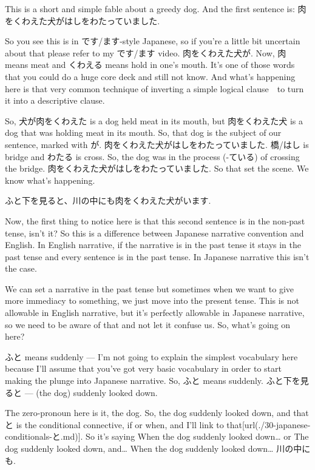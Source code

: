 This is a short and simple fable about a greedy dog. And the first sentence is: 肉をくわえた犬がはしをわたっていました.

{}

So you see this is in です/ます-style Japanese, so if you're a little bit uncertain about that please refer to my です/ます video. 肉をくわえた犬が. Now, 肉 means meat and くわえる means hold in one's mouth. It's one of those words that you could do a huge core deck and still not know. And what's happening here is that very common technique of inverting a simple logical clause　to turn it into a descriptive clause.

{}

So, 犬が肉をくわえた is a dog held meat in its mouth, but 肉をくわえた犬 is a dog that was holding meat in its mouth. So, that dog is the subject of our sentence, marked with が. 肉をくわえた犬がはしをわたっていました. 橋/はし is bridge and わたる is cross. So, the dog was in the process (-ている) of crossing the bridge. 肉をくわえた犬がはしをわたっていました. So that set the scene. We know what's happening.

ふと下を見ると、川の中にも肉をくわえた犬がいます.

{}

Now, the first thing to notice here is that this second sentence is in the non-past tense, isn't it? So this is a difference between Japanese narrative convention and English. In English narrative, if the narrative is in the past tense it stays in the past tense and every sentence is in the past tense. In Japanese narrative this isn't the case.

We can set a narrative in the past tense but sometimes when we want to give more immediacy to something, we just move into the present tense. This is not allowable in English narrative, but it's perfectly allowable in Japanese narrative, so we need to be aware of that and not let it confuse us. So, what's going on here?

ふと means suddenly --- I'm not going to explain the simplest vocabulary here because I'll assume that you've got very basic vocabulary in order to start making the plunge into Japanese narrative. So, ふと means suddenly. ふと下を見ると --- (the dog) suddenly looked down.

The zero-pronoun here is it, the dog. So, the dog suddenly looked down, and that と is the conditional connective, if or when, and I'll link to that\goto{{[}30{]}}[url(./30-japanese-conditionals-と.md)]. So it's saying When the dog suddenly looked down\ldots{} or The dog suddenly looked down, and\ldots{} When the dog suddenly looked down\ldots{} 川の中にも.

